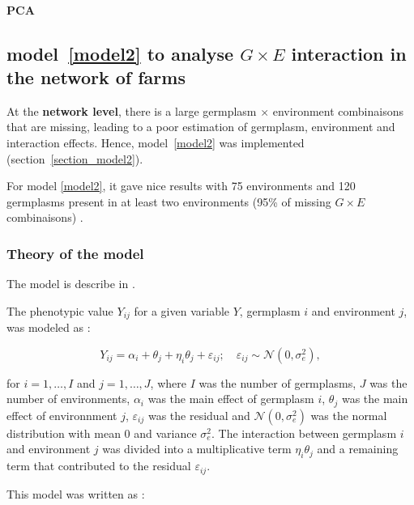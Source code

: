 \documentclass{article}\usepackage[]{graphicx}\usepackage[]{color}
\begin{document}
\paragraph{PCA}






\newpage


\subsection{model~\ref{model2} to analyse $G \times E$ interaction in the network of farms }
\label{model_2}

At the \textbf{network level}, there is a large germplasm $\times$ environment combinaisons that are missing, leading to a poor estimation of germplasm, environment and interaction effects.
Hence, model~\ref{model2} was implemented (section~\ref{section_model2}).

For model \ref{model2}, it gave nice results with 75 environments and 120 germplasms present in at least two environments (95\% of missing $G \times E$ combinaisons) \citep{riviere_hierarchical_2016}.


\subsubsection{Theory of the model}
The model is describe in \citet{riviere_hierarchical_2016}.

The phenotypic value $Y_{ij}$ for a given variable $Y$, germplasm $i$ and environment $j$, was modeled as :

\begin{displaymath}
Y_{ij} = \alpha_{i} + \theta_{j} + \eta_{i}\theta_{j} + \varepsilon_{ij} ; \quad \varepsilon_{ij} \sim \mathcal{N} (0,\sigma^2_{e}),
\label{modele_gxe}
\end{displaymath}

for $i = 1,\ldots, I$ and $j = 1,\ldots, J$, where 
$I$ was the number of germplasms, 
$J$ was the number of environments,
$\alpha_{i}$ was the main effect of germplasm $i$,
$\theta_{j}$ was the main effect of environnment $j$,
$\varepsilon_{ij}$ was the residual and 
$\mathcal{N} (0,\sigma^2_{e})$ was the normal distribution with mean 0 and variance $\sigma^2_{e}$.
The interaction between germplasm $i$ and environment $j$ was divided into a multiplicative term $\eta_{i}\theta_{j}$ and a remaining term that contributed to the residual $\varepsilon_{ij}$.

This model was written as :
\end{document}
